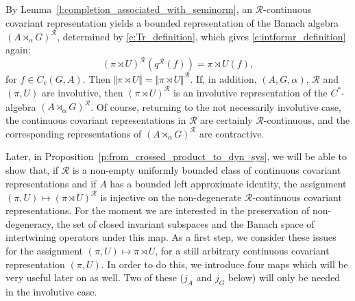 \documentclass{amsart}
\theoremstyle{plain}
\theoremstyle{definition}
\numberwithin{equation}{section}
\begin{document}
By Lemma~\ref{l:completion_associated_with_seminorm}, an ${\mathcal R}$-continuous covariant representation yields a bounded representation of the Banach algebra ${(A {\rtimes}_\alpha G)^\mathcal{R}}$, determined by \eqref{e:Tr_definition}, which gives \eqref{e:intformr_definition} again:
\begin{equation}
({\pi \rtimes U})^{\mathcal R}({q^{\mathcal R}}(f))={\pi \rtimes U}(f),
\end{equation}
for $f\in C_c(G,A)$. Then $\Vert {\pi \rtimes U} \Vert=\Vert {\pi \rtimes U}\Vert^{\mathcal R}$. If, in addition, ${(A,G,\alpha)}$, ${\mathcal R}$ and ${(\pi,U)}$ are involutive, then $({\pi \rtimes U})^{\mathcal R}$ is an involutive representation of the $C^*$-algebra ${(A {\rtimes}_\alpha G)^\mathcal{R}}$. Of course, returning to the not necessarily involutive case, the continuous covariant representations in ${\mathcal R}$ are certainly ${\mathcal R}$-continuous, and the corresponding representations of ${(A {\rtimes}_\alpha G)^\mathcal{R}}$ are contractive.

Later, in Proposition~\ref{p:from_crossed_product_to_dyn_sys}, we will be able to show that, if ${\mathcal R}$ is a non-empty uniformly bounded class of continuous covariant representations and if $A$ has a bounded left approximate identity, the assignment ${(\pi,U)} \mapsto ({\pi \rtimes U})^{\mathcal R}$ is injective on the non-degenerate ${\mathcal R}$-continuous covariant representations. For the moment we are interested in the preservation of non-degeneracy, the set of closed invariant subspaces and the Banach space of intertwining operators under this map. As a first step, we consider these issues for the assignment ${(\pi,U)} \mapsto {\pi \rtimes U}$, for a still arbitrary continuous covariant representation ${(\pi,U)}$. In order to do this, we introduce four maps which will be very useful later on as well. Two of these ($j_A$ and $j_G$ below) will only be needed in the involutive case.
\end{document}
